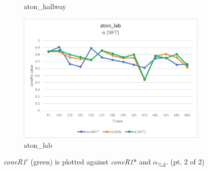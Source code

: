 \begin{appendices}
\begin{figure}
\begin{subfigure}{.45\linewidth}
  \caption{aton\_hallway}
\end{subfigure}
\hfill
\begin{subfigure}{.45\linewidth}
  \includegraphics[width=1\linewidth]{figures/appendix/lab_sift.jpg}
  \caption{aton\_lab}
\end{subfigure}

\caption{\textit{coneR1}$'$ (green) is plotted against \textit{coneR1}* and $\alpha_{\%\Delta}$. (pt. 2 of 2)}
\end{figure}


\end{appendices}
